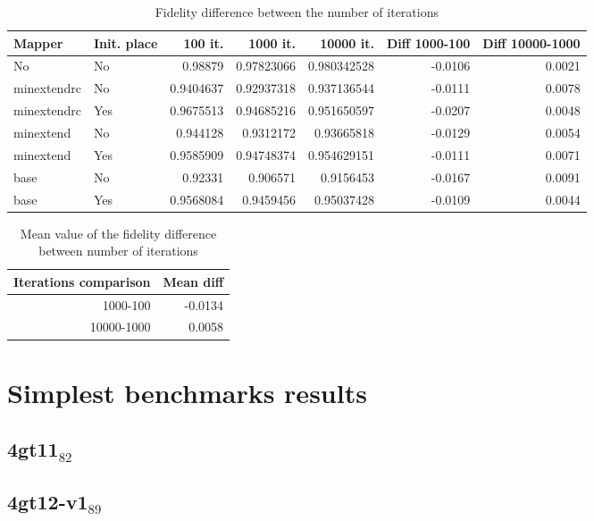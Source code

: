 \documentclass[11pt]{article}
\begin{document}
\begin{table}[htbp]
\caption{\label{tab:org41e025f}
Fidelity difference between the number of iterations}
\centering
\begin{tabular}{llrrrrr}
\hline
Mapper & Init. place & 100 it. & 1000 it. & 10000 it. & Diff 1000-100 & Diff 10000-1000\\
\hline
No & No & 0.98879 & 0.97823066 & 0.980342528 & -0.0106 & 0.0021\\
\hline
minextendrc & No & 0.9404637 & 0.92937318 & 0.937136544 & -0.0111 & 0.0078\\
minextendrc & Yes & 0.9675513 & 0.94685216 & 0.951650597 & -0.0207 & 0.0048\\
minextend & No & 0.944128 & 0.9312172 & 0.93665818 & -0.0129 & 0.0054\\
minextend & Yes & 0.9585909 & 0.94748374 & 0.954629151 & -0.0111 & 0.0071\\
base & No & 0.92331 & 0.906571 & 0.9156453 & -0.0167 & 0.0091\\
base & Yes & 0.9568084 & 0.9459456 & 0.95037428 & -0.0109 & 0.0044\\
\hline
\end{tabular}
\end{table}

\begin{table}[htbp]
\caption{\label{tab:orgde69669}
Mean value of the fidelity difference between number of iterations}
\centering
\begin{tabular}{rr}
\hline
Iterations comparison & Mean diff\\
\hline
1000-100 & -0.0134\\
10000-1000 & 0.0058\\
\hline
\end{tabular}
\end{table}






\section{Simplest benchmarks results}
\label{sec:orgfc80f87}

\subsection{4gt11\(_{\text{82}}\)}
\label{sec:org2102fc5}

\subsection{4gt12-v1\(_{\text{89}}\)}
\label{sec:org4b9e2ee}
\end{document}

